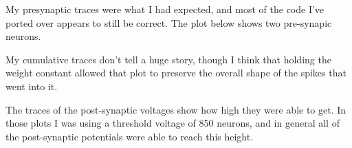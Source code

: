 \documentclass[a4paper,12pt]{article}
\begin{document}
\begin{center}
\begin{figure}[ht!]
\end{figure}
\end{center}

My presynaptic traces were what I had expected, and most of the code I've ported over appears to still be correct. The plot below shows two pre-synapic neurons. 

\vspace{2mm}

My cumulative traces don't tell a huge story, though I think that holding the weight constant allowed that plot to preserve the overall shape of the spikes that went into it. 

\begin{center}
\begin{figure}[ht!]
\end{figure}
\end{center}

\begin{center}
\begin{figure}[ht!]
\end{figure}
\end{center}

\begin{center}
\begin{figure}[ht!]
\end{figure}
\end{center}

\begin{center}
\begin{figure}[ht!]
\end{figure}
\end{center}

The traces of the post-synaptic voltages show how high they were able to get. In those plots I was using a threshold voltage of 850 neurons, and in general all of the post-synaptic potentials were able to reach this height. 

\vspace{2mm}
\end{document}
